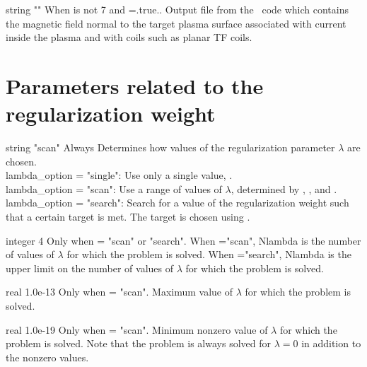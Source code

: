 \myhrule

{string}
{{\ttfamily ""}}
{When  is not 7 and ={\ttfamily .true.}.}
{Output file from the \bnorm~code which contains the magnetic field normal to the target
plasma surface associated with current inside the plasma and with coils such as planar TF coils.}

\myhrule

\section{Parameters related to the regularization weight}

{string}
{"scan"}
{Always}
{Determines how values of the regularization parameter $\lambda$ are chosen.\\

{\ttfamily lambda\_option = "single"}: Use only a single value, .\\

{\ttfamily lambda\_option = "scan"}: Use a range of values of $\lambda$, determined by , , and .\\

{\ttfamily lambda\_option = "search"}: Search for a value of the regularization weight such that
a certain target is met. The target is chosen using .
}

\myhrule

{integer}
{4}
{Only when  = {\ttfamily "scan"} or {\ttfamily "search"}.}
{When ={\ttfamily "scan"}, {\ttfamily Nlambda} is the number of values of $\lambda$ for which the problem is solved.
When ={\ttfamily "search"}, {\ttfamily Nlambda} is the upper limit on the number of values of $\lambda$ for which the problem is solved.}

\myhrule

{real}
{1.0e-13}
{Only when  = {\ttfamily "scan"}.}
{Maximum value of $\lambda$ for which the problem is solved.}

\myhrule

{real}
{1.0e-19}
{Only when  = {\ttfamily "scan"}.}
{Minimum nonzero value of $\lambda$ for which the problem is solved.
Note that the problem is always solved for $\lambda=0$ in addition to
the nonzero values.}

